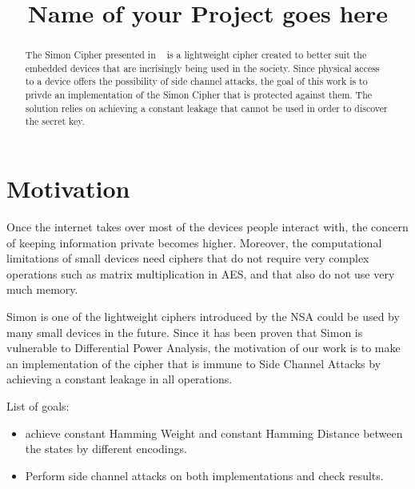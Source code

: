 \documentclass[conference]{IEEEtran}
\begin{document}
\title{Name of your Project goes here}


\author{
}
\maketitle

\begin{abstract}

  The Simon Cipher presented in ~\cite{Beaulieu_Simon} is a lightweight cipher created to better suit the embedded devices that are incrisingly being used in the society. Since physical access to a device offers the possibility of side channel attacks, the goal of this work is to privde an implementation of the Simon Cipher that is protected against them. The solution relies on achieving a constant leakage that cannot be used in order to discover the secret key.

\end{abstract}

\section{Motivation}

Once the internet takes over most of the devices people interact with, the concern of keeping information private becomes higher. Moreover, the computational limitations of small devices need ciphers that do not require very complex operations such as matrix multiplication in AES, and that also do not use very much memory.

Simon is one of the lightweight ciphers introduced by the NSA could be used by many small devices in the future. Since it has been proven that Simon is vulnerable to Differential Power Analysis, the motivation of our work is to make an implementation of the cipher that is immune to Side Channel Attacks by achieving a constant leakage in all operations.  

List of goals:
\begin{itemize}
        \item achieve constant Hamming Weight and constant Hamming Distance between the states by different encodings.
        \item Perform side channel attacks on both implementations and check results.
\end{itemize}
\end{document}
